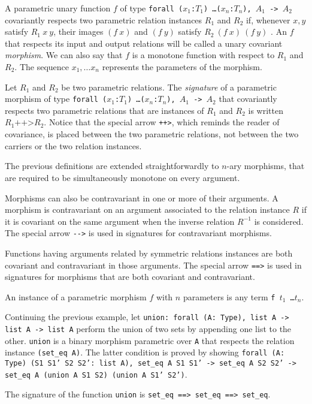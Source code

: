 A parametric unary function $f$ of type
\texttt{forall ($x_1$:$T_1$) \ldots ($x_n$:$T_n$), $A_1$ -> $A_2$}
covariantly respects two parametric relation instances $R_1$ and $R_2$ if,
whenever $x, y$ satisfy $R_1~x~y$, their images $(f~x)$ and $(f~y)$ 
satisfy $R_2~(f~x)~(f~y)$ . An $f$ that respects its input and output relations
will be called a unary covariant \emph{morphism}. We can also say that $f$ is
a monotone function with respect to $R_1$ and $R_2$. The sequence $x_1,\ldots x_n$ represents the parameters of the morphism.

Let $R_1$ and $R_2$ be two parametric relations.
The \emph{signature} of a parametric morphism of type
\texttt{forall ($x_1$:$T_1$) \ldots ($x_n$:$T_n$), $A_1$ -> $A_2$} that
covariantly respects two parametric relations that are instances of
$R_1$ and $R_2$ is written $R_1 \texttt{++>} R_2$.
Notice that the special arrow \texttt{++>}, which reminds the reader
of covariance, is placed between the two parametric relations, not
between the two carriers or the two relation instances.

The previous definitions are extended straightforwardly to $n$-ary morphisms,
that are required to be simultaneously monotone on every argument.

Morphisms can also be contravariant in one or more of their arguments.
A morphism is contravariant on an argument associated to the relation instance
$R$ if it is covariant on the same argument when the inverse relation
$R^{-1}$ is considered. The special arrow \texttt{-{}->} is used in signatures
for contravariant morphisms.

Functions having arguments related by symmetric relations instances are both
covariant and contravariant in those arguments. The special arrow
\texttt{==>} is used in signatures for morphisms that are both covariant
and contravariant.

An instance of a parametric morphism $f$ with $n$ parameters is any term
\texttt{f $t_1$ \ldots $t_n$}.

\begin{cscexample}[Morphisms]
Continuing the previous example, let
\texttt{union: forall (A: Type), list A -> list A -> list A} perform the union
of two sets by appending one list to the other. \texttt{union} is a binary
morphism parametric over \texttt{A} that respects the relation instance
\texttt{(set\_eq A)}. The latter condition is proved by showing
\texttt{forall (A: Type) (S1 S1' S2 S2': list A), set\_eq A S1 S1' ->
 set\_eq A S2 S2' -> set\_eq A (union A S1 S2) (union A S1' S2')}.

The signature of the function \texttt{union} is
\texttt{set\_eq ==> set\_eq ==> set\_eq}.
\end{cscexample}


